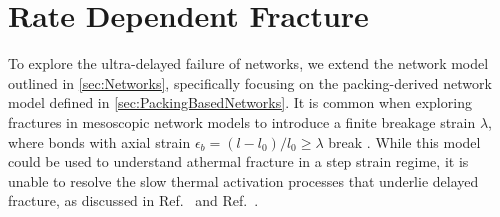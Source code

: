 

\section{Rate Dependent Fracture} \label{sec:BoltzmanFracture}
To explore the ultra-delayed failure of networks, we extend the network model outlined in \cref{sec:Networks}, specifically focusing on the packing-derived network model defined in \cref{sec:PackingBasedNetworks}. It is common when exploring fractures in mesoscopic network models to introduce a finite breakage strain $\lambda$, where bonds with axial strain $\epsilon_b=(l-l_0)/l_0 \geq \lambda$ break \cite{tauber_stretchy_2022}. While this model could be used to understand athermal fracture in a step strain regime, it is unable to resolve the slow thermal activation processes that underlie delayed fracture, as discussed in Ref.~\cite{lockwood_ultradelayed_2025} and Ref.~\cite{lockwood_yielding_nodate}.


